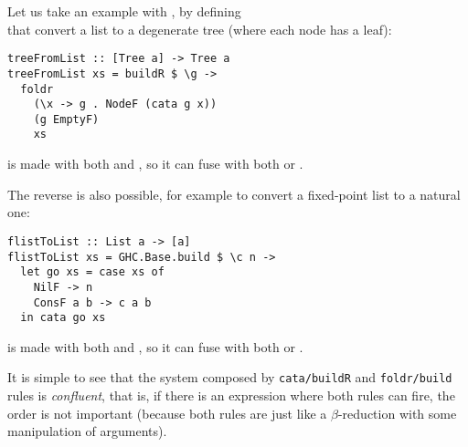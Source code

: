 Let us take an example with , by defining\\  that convert a list to a degenerate tree (where each node has a leaf):
\begin{verbatim}
treeFromList :: [Tree a] -> Tree a
treeFromList xs = buildR $ \g ->
  foldr
    (\x -> g . NodeF (cata g x))
    (g EmptyF)
    xs
\end{verbatim}
\noindent {} is made with both  and , so it can fuse with both  or .

The reverse is also possible, for example to convert a fixed-point list to a natural one:
\begin{verbatim}
flistToList :: List a -> [a]
flistToList xs = GHC.Base.build $ \c n ->
  let go xs = case xs of
    NilF -> n
    ConsF a b -> c a b
  in cata go xs
\end{verbatim}
\noindent {} is made with both  and , so it can fuse with both  or .

It is simple to see that the system composed by \verb|cata/buildR| and \verb|foldr/build| rules is \emph{confluent}, that is, if there is an expression where both rules can fire, the order is not important (because both rules are just like a $\beta$-reduction with some manipulation of arguments).